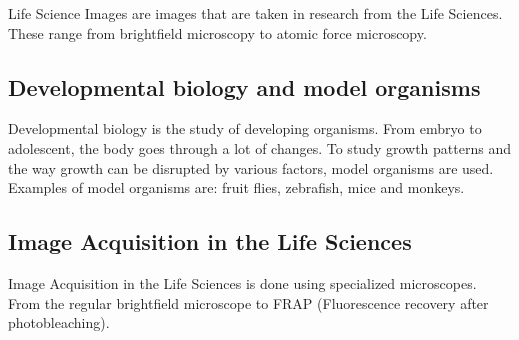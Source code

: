 Life Science Images are images that
are taken in research from the Life Sciences. These range from
brightfield microscopy to atomic force
microscopy.


\subsection{Developmental biology and model organisms}

Developmental biology is the study
of developing organisms. From embryo to
adolescent, the body goes through a lot
of changes. To study growth patterns and the way growth can be
disrupted by various factors, model organisms are used. Examples of model organisms are: fruit
flies, zebrafish, mice and monkeys.


\subsection{Image Acquisition in the Life Sciences}

Image Acquisition in the Life Sciences
is done using specialized microscopes. From the regular brightfield
microscope to FRAP (Fluorescence
recovery after photobleaching).
